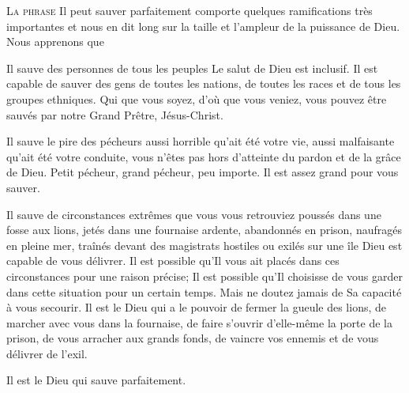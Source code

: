 

\lettrine{L}{a phrase\frcolon{}} 
 \Og Il peut sauver parfaitement \Fg{} comporte quelques ramifications
 très importantes et nous en dit long sur la taille et l'ampleur
 de la puissance de Dieu. Nous apprenons que\frcolon{} 

Il sauve des personnes de tous les peuples
 \ocadr Le salut de Dieu est inclusif.
 Il est capable de sauver des gens de toutes les nations,
 de toutes les races et de tous les groupes ethniques.
 Qui que vous soyez, d'où que vous veniez,
 vous pouvez être sauvés par notre Grand Prêtre, Jésus-Christ. 


Il sauve le pire des pécheurs \ocadr aussi horrible qu'ait été votre vie,
 aussi malfaisante qu'ait été votre conduite, vous n'êtes pas
 hors d'atteinte du pardon et de la grâce de Dieu.
 Petit pécheur, grand pécheur, peu importe.
 Il est assez grand pour vous sauver. 

Il sauve de circonstances extrêmes \ocadr que vous vous retrouviez poussés
 dans une fosse aux lions, jetés dans une fournaise ardente,
 abandonnés en prison, naufragés en pleine mer,
 traînés devant des magistrats hostiles ou exilés sur une île
 \ocadr Dieu est capable de vous délivrer.
 Il est possible qu'Il vous ait placés dans ces circonstances
 pour une raison précise; Il est possible qu'Il choisisse de vous garder
 dans cette situation pour un certain temps.
 Mais ne doutez jamais de Sa capacité à vous secourir.
 Il est le Dieu qui a le pouvoir de fermer la gueule des lions,
 de marcher avec vous dans la fournaise, de faire s'ouvrir d'elle-même
 la porte de la prison, de vous arracher aux grands fonds,
 de vaincre vos ennemis et de vous délivrer de l'exil. 

Il est le Dieu qui sauve parfaitement. 

\dvrule




